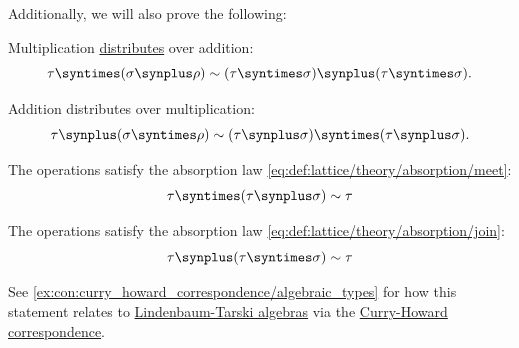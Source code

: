 \begin{proposition}
  Additionally, we will also prove the following:
  \begin{thmenum}[resume=thm:simple_algebraic_type_arithmetic]
     Multiplication \hyperref[def:semiring]{distributes} over addition:
    \begin{equation}\label{eq:thm:simple_algebraic_type_arithmetic/multiplication_distributes}
      \tau \syntimes (\sigma \synplus \rho) \sim (\tau \syntimes \sigma) \synplus (\tau \syntimes \sigma).
    \end{equation}

     Addition distributes over multiplication:
    \begin{equation}\label{eq:thm:simple_algebraic_type_arithmetic/addition_distributes}
      \tau \synplus (\sigma \syntimes \rho) \sim (\tau \synplus \sigma) \syntimes (\tau \synplus \sigma).
    \end{equation}

     The operations satisfy the absorption law \eqref{eq:def:lattice/theory/absorption/meet}:
    \begin{equation}\label{eq:thm:simple_algebraic_type_arithmetic/multiplication_absorbs}
      \tau \syntimes (\tau \synplus \sigma) \sim \tau
    \end{equation}

     The operations satisfy the absorption law \eqref{eq:def:lattice/theory/absorption/join}:
    \begin{equation}\label{eq:thm:simple_algebraic_type_arithmetic/addition_absorbs}
      \tau \synplus (\tau \syntimes \sigma) \sim \tau
    \end{equation}
  \end{thmenum}
\end{proposition}
\begin{comments}
  \item See \cref{ex:con:curry_howard_correspondence/algebraic_types} for how this statement relates to \hyperref[def:lindenbaum_tarski_algebra]{Lindenbaum-Tarski algebras} via the \hyperref[con:curry_howard_correspondence]{Curry-Howard correspondence}.
\end{comments}

